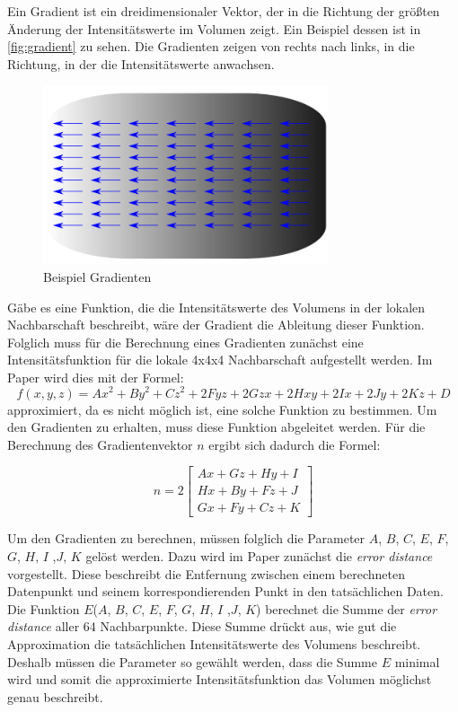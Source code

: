 Ein Gradient ist ein dreidimensionaler Vektor, der in die Richtung der größten Änderung der Intensitätswerte im Volumen zeigt. Ein Beispiel dessen ist in \autoref{fig:gradient} zu sehen. Die Gradienten zeigen von rechts nach links, in die Richtung, in der die Intensitätswerte anwachsen.


\begin{figure}[!h] 
\centering 
\includegraphics[width=0.75\textwidth]{Logos/Gradient.PNG}
\caption{Beispiel Gradienten} 
\label{fig:gradient} 
\end{figure}



Gäbe es eine Funktion, die die Intensitätswerte des Volumens in der lokalen Nachbarschaft beschreibt, wäre der Gradient die Ableitung dieser Funktion. Folglich muss für die Berechnung eines Gradienten zunächst eine Intensitätsfunktion für die lokale 4x4x4 Nachbarschaft aufgestellt werden. Im Paper wird dies mit der Formel:
\begin{equation}
	f(x,y,z) = Ax^{2}+By^{2}+Cz^{2}+2Fyz+2Gzx+2Hxy+2Ix+2Jy+2Kz+D
\end{equation}
approximiert, da es nicht möglich ist, eine solche Funktion zu bestimmen. Um den Gradienten zu erhalten, muss diese Funktion abgeleitet werden. Für die Berechnung des Gradientenvektor $n$ ergibt sich dadurch die Formel:


\begin{equation}
	n =2\begin{bmatrix}
           Ax + Gz + Hy + I \\
           Hx + By + Fz + J \\
           Gx + Fy + Cz + K
         \end{bmatrix} 
\end{equation}

Um den Gradienten zu berechnen, müssen folglich die Parameter $A$, $B$, $C$, $E$, $F$, $G$, $H$, $I$ ,$J$, $K$ gelöst werden. Dazu wird im Paper zunächst die \textit{error distance} vorgestellt. Diese beschreibt die Entfernung zwischen einem berechneten Datenpunkt und seinem korrespondierenden Punkt in den tatsächlichen Daten. Die Funktion $E$($A$, $B$, $C$, $E$, $F$, $G$, $H$, $I$ ,$J$, $K$) berechnet die Summe der \textit{error distance} aller 64 Nachbarpunkte. Diese Summe drückt aus, wie gut die Approximation die tatsächlichen Intensitätswerte des Volumens beschreibt. Deshalb müssen die Parameter so gewählt werden, dass die Summe $E$ minimal wird und somit die approximierte Intensitätsfunktion das Volumen möglichst genau beschreibt.


